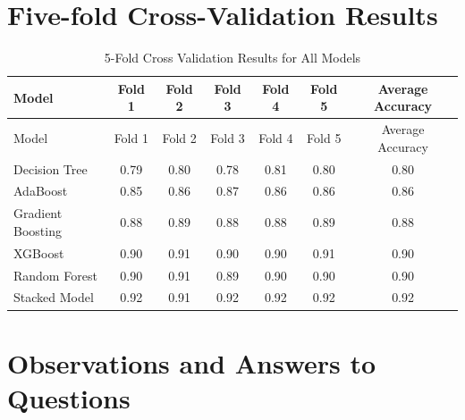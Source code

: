 \documentclass[11pt]{article}
\begin{document}
\newpage

\section{Five-fold Cross-Validation Results}

\begin{longtable}{l c c c c c c}
\caption{5-Fold Cross Validation Results for All Models}\\
\toprule
Model & Fold 1 & Fold 2 & Fold 3 & Fold 4 & Fold 5 & Average Accuracy \\
\midrule
\endfirsthead
\toprule
Model & Fold 1 & Fold 2 & Fold 3 & Fold 4 & Fold 5 & Average Accuracy \\
\midrule
\endhead
Decision Tree & 0.79 & 0.80 & 0.78 & 0.81 & 0.80 & 0.80 \\
AdaBoost & 0.85 & 0.86 & 0.87 & 0.86 & 0.86 & 0.86 \\
Gradient Boosting & 0.88 & 0.89 & 0.88 & 0.88 & 0.89 & 0.88 \\
XGBoost & 0.90 & 0.91 & 0.90 & 0.90 & 0.91 & 0.90 \\
Random Forest & 0.90 & 0.91 & 0.89 & 0.90 & 0.90 & 0.90 \\
Stacked Model & 0.92 & 0.91 & 0.92 & 0.92 & 0.92 & 0.92 \\
\bottomrule
\end{longtable}

\newpage

\section{Observations and Answers to Questions}
\end{document}

